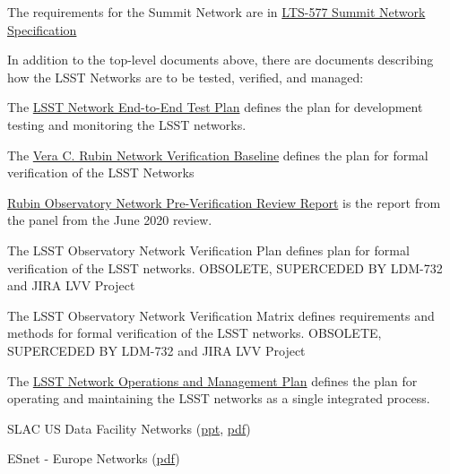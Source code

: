 The requirements for the Summit Network are in \href{https://docushare.lsstcorp.org/docushare/dsweb/Get/LTS-577/LTS-577%20Summit%20Network%20Specification%20Rel1%2006292017.pdf}{LTS-577 Summit Network Specification}

In addition to the top-level documents above, there are documents describing how the LSST Networks are to be tested, verified, and managed:

The \href{https://confluence.lsstcorp.org/download/attachments/20284335/LSST%20LHN%20End-to-End_Plan_v6.docx?version=1&modificationDate=1490879785000&api=v2}{LSST Network End-to-End Test Plan} defines the plan for development testing and monitoring the LSST networks.

The \href{https://docushare.lsstcorp.org/docushare/dsweb/Get/LDM-732/NoContent8135677362395171770.txt}{Vera C. Rubin Network Verification Baseline} defines the plan for formal verification of the LSST Networks

\href{https://docushare.lsstcorp.org/docushare/dsweb/Get/Document-35934/Rubin%20Observatory%20Networks%20Pre-Verification%20Review%20Report%202020-06-22.pdf}{Rubin Observatory Network Pre-Verification Review Report} is the report from the panel from the June 2020 review.

The LSST Observatory Network Verification Plan defines plan for formal verification of the LSST networks.  OBSOLETE, SUPERCEDED BY LDM-732 and JIRA LVV Project

The LSST Observatory Network Verification Matrix defines requirements and methods for formal verification of the LSST networks. OBSOLETE, SUPERCEDED BY LDM-732 and JIRA LVV Project

The \href{https://confluence.lsstcorp.org/download/attachments/20284335/LSST%20Network%20O%26M%20Plan_v2.docx?version=1&modificationDate=1490879794000&api=v2}{LSST Network Operations and Management Plan}  defines the plan for operating and maintaining the LSST networks as a single integrated process.

SLAC US Data Facility Networks (\href{https://confluence.lsstcorp.org/download/attachments/20284335/Rubin-SLAC-ESNET-p1.pptx?version=1&modificationDate=1615304516000&api=v2}{ppt}, \href{https://confluence.lsstcorp.org/download/attachments/20284335/Rubin-SLAC-ESNET-p1.pdf?version=1&modificationDate=1615304502000&api=v2}{pdf})

ESnet - Europe Networks (\href{https://confluence.lsstcorp.org/download/attachments/20284335/ESnet-Europe-networks.pdf?version=1&modificationDate=1615479399000&api=v2}{pdf})